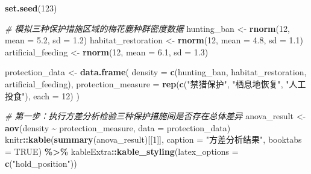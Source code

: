 \documentclass[
  twoside,12pt,fontset=none]{ctexbook}
\newenvironment{Shaded}{\begin{snugshade}}{\end{snugshade}}
\newcommand{\AttributeTok}[1]{\textcolor[rgb]{0.13,0.29,0.53}{#1}}
\newcommand{\CommentTok}[1]{\textcolor[rgb]{0.56,0.35,0.01}{\textit{#1}}}
\newcommand{\ConstantTok}[1]{\textcolor[rgb]{0.56,0.35,0.01}{#1}}
\newcommand{\DecValTok}[1]{\textcolor[rgb]{0.00,0.00,0.81}{#1}}
\newcommand{\FloatTok}[1]{\textcolor[rgb]{0.00,0.00,0.81}{#1}}
\newcommand{\FunctionTok}[1]{\textcolor[rgb]{0.13,0.29,0.53}{\textbf{#1}}}
\newcommand{\NormalTok}[1]{#1}
\newcommand{\OtherTok}[1]{\textcolor[rgb]{0.56,0.35,0.01}{#1}}
\newcommand{\SpecialCharTok}[1]{\textcolor[rgb]{0.81,0.36,0.00}{\textbf{#1}}}
\newcommand{\StringTok}[1]{\textcolor[rgb]{0.31,0.60,0.02}{#1}}
\begin{document}
\begin{Shaded}
\begin{Highlighting}[]
\FunctionTok{set.seed}\NormalTok{(}\DecValTok{123}\NormalTok{)}

\CommentTok{\# 模拟三种保护措施区域的梅花鹿种群密度数据}
\NormalTok{hunting\_ban }\OtherTok{\textless{}{-}} \FunctionTok{rnorm}\NormalTok{(}\DecValTok{12}\NormalTok{, }\AttributeTok{mean =} \FloatTok{5.2}\NormalTok{, }\AttributeTok{sd =} \FloatTok{1.2}\NormalTok{)}
\NormalTok{habitat\_restoration }\OtherTok{\textless{}{-}} \FunctionTok{rnorm}\NormalTok{(}\DecValTok{12}\NormalTok{, }\AttributeTok{mean =} \FloatTok{4.8}\NormalTok{, }\AttributeTok{sd =} \FloatTok{1.1}\NormalTok{)}
\NormalTok{artificial\_feeding }\OtherTok{\textless{}{-}} \FunctionTok{rnorm}\NormalTok{(}\DecValTok{12}\NormalTok{, }\AttributeTok{mean =} \FloatTok{6.1}\NormalTok{, }\AttributeTok{sd =} \FloatTok{1.3}\NormalTok{)}

\NormalTok{protection\_data }\OtherTok{\textless{}{-}} \FunctionTok{data.frame}\NormalTok{(}
  \AttributeTok{density =} \FunctionTok{c}\NormalTok{(hunting\_ban, habitat\_restoration, artificial\_feeding),}
  \AttributeTok{protection\_measure =} \FunctionTok{rep}\NormalTok{(}\FunctionTok{c}\NormalTok{(}\StringTok{"禁猎保护"}\NormalTok{, }\StringTok{"栖息地恢复"}\NormalTok{, }\StringTok{"人工投食"}\NormalTok{), }\AttributeTok{each =} \DecValTok{12}\NormalTok{)}
\NormalTok{)}
\end{Highlighting}
\end{Shaded}

\begin{Shaded}
\begin{Highlighting}[]
\CommentTok{\# 第一步：执行方差分析检验三种保护措施间是否存在总体差异}
\NormalTok{anova\_result }\OtherTok{\textless{}{-}} \FunctionTok{aov}\NormalTok{(density }\SpecialCharTok{\textasciitilde{}}\NormalTok{ protection\_measure, }\AttributeTok{data =}\NormalTok{ protection\_data)}
\NormalTok{knitr}\SpecialCharTok{::}\FunctionTok{kable}\NormalTok{(}\FunctionTok{summary}\NormalTok{(anova\_result)[[}\DecValTok{1}\NormalTok{]],}
             \AttributeTok{caption =} \StringTok{"方差分析结果"}\NormalTok{,}
             \AttributeTok{booktabs =} \ConstantTok{TRUE}\NormalTok{) }\SpecialCharTok{\%\textgreater{}\%}
\NormalTok{  kableExtra}\SpecialCharTok{::}\FunctionTok{kable\_styling}\NormalTok{(}\AttributeTok{latex\_options =} \FunctionTok{c}\NormalTok{(}\StringTok{"hold\_position"}\NormalTok{))}
\end{Highlighting}
\end{Shaded}
\end{document}
